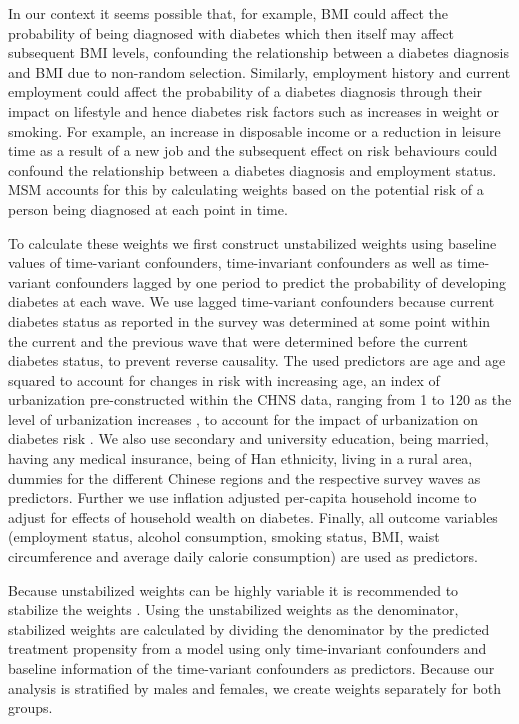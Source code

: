 In our context it seems possible that, for example, \ac{BMI} could affect the probability of being diagnosed with diabetes which then itself may affect subsequent \ac{BMI} levels, confounding the relationship between a diabetes diagnosis and \ac{BMI} due to non-random selection. Similarly, employment history and current employment could affect the probability of a diabetes diagnosis through their impact on lifestyle and hence diabetes risk factors such as increases in weight or smoking. For example, an increase in disposable income or a reduction in leisure time as a result of a new job and the subsequent effect on risk behaviours could confound the relationship between a diabetes diagnosis and employment status. \ac{MSM} accounts for this by calculating weights based on the potential risk of a person being diagnosed at each point in time. 

To calculate these weights we first construct unstabilized weights using baseline values of time-variant confounders, time-invariant confounders as well as time-variant confounders lagged by one period to predict the probability of developing diabetes at each wave. We use lagged time-variant confounders because current diabetes status as reported in the survey was determined at some point within the current and the previous wave that were determined before the current diabetes status, to prevent reverse causality. The used predictors are age and age squared to account for changes in risk with increasing age, an index of urbanization pre-constructed within the \ac{CHNS} data, ranging from 1 to 120 as the level of urbanization increases \parencite{Zhang2014d}, to account for the impact of urbanization on diabetes risk \parencite{Attard2012}. We also use secondary and university education, being married, having any medical insurance, being of Han ethnicity, living in a rural area, dummies for the different Chinese regions and the respective survey waves as predictors. Further we use inflation adjusted per-capita household income to adjust for effects of household wealth on diabetes. Finally, all outcome variables (employment status, alcohol consumption, smoking status, \ac{BMI}, waist circumference and average daily calorie consumption) are used as predictors. 

Because unstabilized weights can be highly variable it is recommended to stabilize the weights \parencite{Cole2008}. Using the unstabilized weights as the denominator, stabilized weights are calculated by dividing the denominator by the predicted treatment propensity from a model using only time-invariant confounders and baseline information of the time-variant confounders as predictors.  Because our analysis is stratified by males and females, we create weights separately for both groups.

